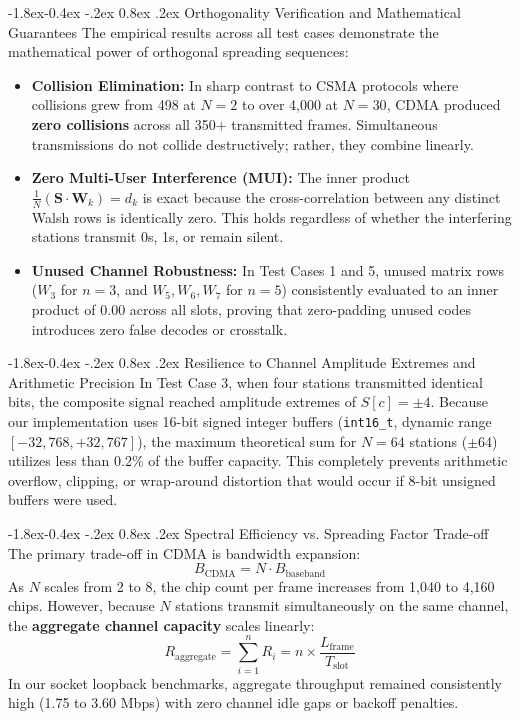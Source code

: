 \documentclass[11pt,a4paper]{article}
\makeatletter
\renewcommand\subsection{\@startsection{subsection}{2}{\z@}%
                                     {-1.8ex\@plus -0.4ex \@minus -.2ex}%
                                     {0.8ex \@plus .2ex}%
                                     {\normalfont\large\bfseries}}
\makeatother
\begin{document}
\subsection{Orthogonality Verification and Mathematical Guarantees}
The empirical results across all test cases demonstrate the mathematical power of orthogonal spreading sequences:
\begin{itemize}
    \item \textbf{Collision Elimination:} In sharp contrast to CSMA protocols where collisions grew from 498 at $N = 2$ to over 4,000 at $N = 30$, CDMA produced \textbf{zero collisions} across all 350+ transmitted frames. Simultaneous transmissions do not collide destructively; rather, they combine linearly.
    \item \textbf{Zero Multi-User Interference (MUI):} The inner product $\frac{1}{N}(\mathbf{S} \cdot \mathbf{W}_k) = d_k$ is exact because the cross-correlation between any distinct Walsh rows is identically zero. This holds regardless of whether the interfering stations transmit 0s, 1s, or remain silent.
    \item \textbf{Unused Channel Robustness:} In Test Cases 1 and 5, unused matrix rows ($W_3$ for $n = 3$, and $W_5, W_6, W_7$ for $n = 5$) consistently evaluated to an inner product of 0.00 across all slots, proving that zero-padding unused codes introduces zero false decodes or crosstalk.
\end{itemize}

\subsection{Resilience to Channel Amplitude Extremes and Arithmetic Precision}
In Test Case 3, when four stations transmitted identical bits, the composite signal reached amplitude extremes of $S[c] = \pm 4$. 
Because our implementation uses 16-bit signed integer buffers (\texttt{int16\_t}, dynamic range $[-32,768, +32,767]$), the maximum theoretical sum for $N = 64$ stations ($\pm 64$) utilizes less than 0.2\% of the buffer capacity. This completely prevents arithmetic overflow, clipping, or wrap-around distortion that would occur if 8-bit unsigned buffers were used.

\subsection{Spectral Efficiency vs. Spreading Factor Trade-off}
The primary trade-off in CDMA is bandwidth expansion:
\begin{equation}
    B_{\text{CDMA}} = N \cdot B_{\text{baseband}}
\end{equation}
As $N$ scales from 2 to 8, the chip count per frame increases from 1,040 to 4,160 chips. However, because $N$ stations transmit simultaneously on the same channel, the \textbf{aggregate channel capacity} scales linearly:
\begin{equation}
    R_{\text{aggregate}} = \sum_{i=1}^n R_i = n \times \frac{L_{\text{frame}}}{T_{\text{slot}}}
\end{equation}
In our socket loopback benchmarks, aggregate throughput remained consistently high (1.75 to 3.60 Mbps) with zero channel idle gaps or backoff penalties.
\end{document}
